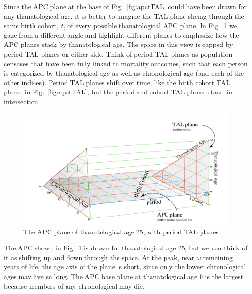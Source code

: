 \documentclass[12pt,oneside,a4paper]{article} %
\begin{document}
Since the APC plane at the base of Fig.~\ref{fig:apctTAL} could have been
drawn for any thanatological age, it is better to imagine the TAL plane slicing
through the same birth cohort, $t$, of every possible thanatological APC plane.
In Fig.~\ref{fig:apctAPC} we gaze from a different angle and highlight
different planes to emphasize how the APC planes stack by thanatological age. The space in
this view is capped by period TAL planes on either side. Think of period TAL
planes as population censuses that have been fully linked to
mortality outcomes, such that each person is categorized by thanatological
age as well as chronological age (and each of the other indices). Period
TAL planes shift over time, like the birth
cohort TAL planes in Fig.~\ref{fig:apctTAL}, but the period and cohort TAL
planes stand in intersection.

\begin{figure}[!h]
\centering
\begin{adjustwidth}{-6em}{-6em}
\caption[cap]{The APC plane of thanatological age 25, with period TAL planes.}
\label{fig:apctAPC}
\includegraphics[scale=.5]{Figures/APCisomarkedup.pdf}
\end{adjustwidth}
\end{figure}

The APC shown in Fig.~\ref{fig:apctAPC} is drawn for thanatological age 25,
but we can think of it as shifting up and down through the space.
At the peak, near $\omega$ remaining years of life, the age axis of the plane is short, since
only the lowest chronological ages may live so long. The APC base plane at
thanatological age 0 is the largest because members of any chronological may
die. 
\end{document}

